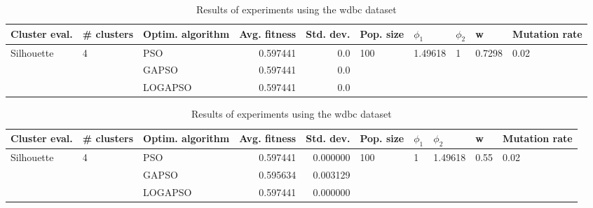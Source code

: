 \documentclass{article}
\begin{document}
\begin{table}
\centering
\caption{Results of experiments using the wdbc dataset}
\begin{tabular}{lllrrlllll}
\toprule
              Cluster eval. &        \# clusters & Optim. algorithm &  Avg. fitness &  Std. dev. &            Pop. size &               $\phi_{1}$ &         $\phi_{2}$ &                       w &         Mutation rate \\
\midrule
\multirow{3}{*}{Silhouette} & \multirow{3}{*}{4} &              PSO &      0.597441 &        0.0 & \multirow{3}{*}{100} & \multirow{3}{*}{1.49618} & \multirow{3}{*}{1} & \multirow{3}{*}{0.7298} & \multirow{3}{*}{0.02} \\
                            &                    &            GAPSO &      0.597441 &        0.0 &                      &                          &                    &                         &                       \\
                            &                    &          LOGAPSO &      0.597441 &        0.0 &                      &                          &                    &                         &                       \\
\bottomrule
\end{tabular}
\end{table}
\begin{table}
\centering
\caption{Results of experiments using the wdbc dataset}
\begin{tabular}{lllrrlllll}
\toprule
              Cluster eval. &        \# clusters & Optim. algorithm &  Avg. fitness &  Std. dev. &            Pop. size &         $\phi_{1}$ &               $\phi_{2}$ &                     w &         Mutation rate \\
\midrule
\multirow{3}{*}{Silhouette} & \multirow{3}{*}{4} &              PSO &      0.597441 &   0.000000 & \multirow{3}{*}{100} & \multirow{3}{*}{1} & \multirow{3}{*}{1.49618} & \multirow{3}{*}{0.55} & \multirow{3}{*}{0.02} \\
                            &                    &            GAPSO &      0.595634 &   0.003129 &                      &                    &                          &                       &                       \\
                            &                    &          LOGAPSO &      0.597441 &   0.000000 &                      &                    &                          &                       &                       \\
\bottomrule
\end{tabular}
\end{table}
\end{document}

